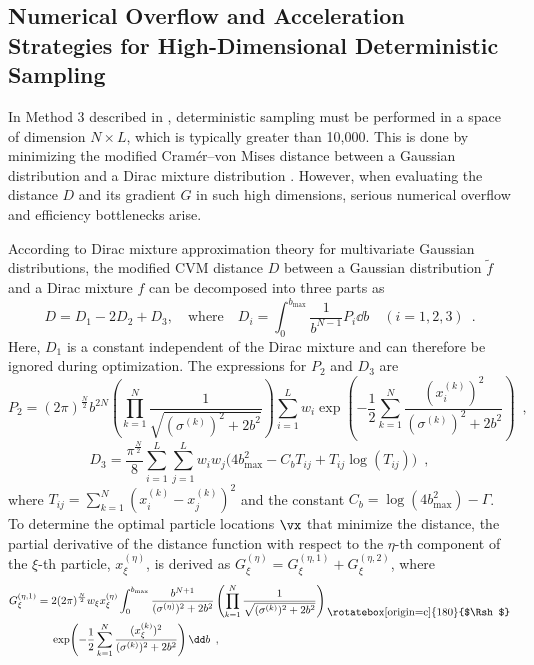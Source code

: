 \subsection{Numerical Overflow and Acceleration Strategies for High-Dimensional Deterministic Sampling}
\label{subsec:overflow_strategies}

In Method 3 described in , deterministic sampling must be performed in a space of dimension $N \times L$, which is typically greater than 10,000. This is done by minimizing the modified Cramér--von Mises distance between a Gaussian distribution and a Dirac mixture distribution \cite{LCDSM}. However, when evaluating the distance $D$ and its gradient $G$ in such high dimensions, serious numerical overflow and efficiency bottlenecks arise.

According to Dirac mixture approximation theory for multivariate Gaussian distributions, the modified CVM distance $D$ between a Gaussian distribution $\tilde{f}$ and a Dirac mixture $f$ can be decomposed into three parts as
\begin{equation}
	D = D_1 - 2D_2 + D_3, \quad \text{where} \quad D_i = \int_0^{b_{\max}} \frac{1}{b^{N-1}} P_i \dd b \quad (i = 1, 2, 3) \enspace .
\end{equation}
Here, $D_1$ is a constant independent of the Dirac mixture and can therefore be ignored during optimization. The expressions for $P_2$ and $D_3$ are
\begin{equation}
	P_2 = (2\pi)^{\frac{N}{2}} b^{2N} \left( \prod_{k=1}^N \frac{1}{\sqrt{(\sigma^{(k)})^2 + 2b^2}} \right) \sum_{i=1}^L w_i \exp\!\left( -\frac{1}{2} \sum_{k=1}^N \frac{(x_i^{(k)})^2}{(\sigma^{(k)})^2 + 2b^2} \right) \enspace ,
\end{equation}
\begin{equation}
	D_3 = \frac{\pi^{\frac{N}{2}}}{8} \sum_{i=1}^L \sum_{j=1}^L w_i w_j \Big( 4b_{\max}^2 - C_b T_{ij} + T_{ij}\log(T_{ij}) \Big) \enspace ,
\end{equation}
where $T_{ij} = \sum_{k=1}^N (x_i^{(k)} - x_j^{(k)})^2$ and the constant $C_b = \log(4b_{\max}^2) - \Gamma$. To determine the optimal particle locations $\vx$ that minimize the distance, the partial derivative of the distance function with respect to the $\eta$-th component of the $\xi$-th particle, $x_\xi^{(\eta)}$, is derived as $G_\xi^{(\eta)} = G_\xi^{(\eta, 1)} + G_\xi^{(\eta, 2)}$, where
\begin{equation}
\begin{split}
    G_\xi^{(\eta, 1)} = {} & 2(2\pi)^{\frac{N}{2}} w_\xi x_\xi^{(\eta)} \int_0^{b_{\text{max}}} \frac{b^{N+1}}{(\sigma^{(\eta)})^2 + 2b^2} \left( \prod_{k=1}^N \frac{1}{\sqrt{(\sigma^{(k)})^2 + 2b^2}} \right) \text{\raisebox{-.7\baselineskip}[0pt][0pt]{\rotatebox[origin=c]{180}{$\Rsh$}}} \\
    & \exp\!\left( -\frac{1}{2} \sum_{k=1}^N \frac{(x_\xi^{(k)})^2}{(\sigma^{(k)})^2 + 2b^2} \right) \dd b \enspace ,
\end{split}
\end{equation}
